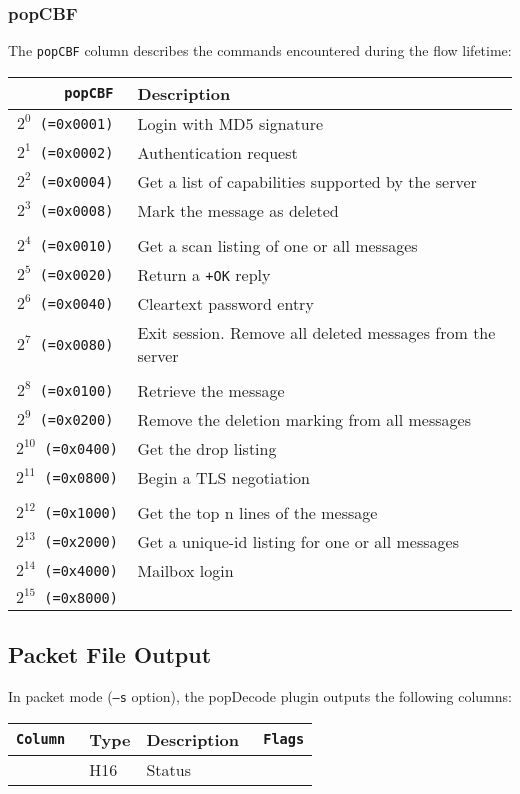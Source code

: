 \documentclass[documentation]{subfiles}
\begin{document}
\subsubsection{popCBF}\label{popCBF}
The {\tt popCBF} column describes the commands encountered during the flow lifetime:
\begin{longtable}{>{\tt}rl}
    \toprule
    {\bf popCBF} & {\bf Description} \\
    \midrule\endhead%
    $2^{0}$  (=0x0001) & Login with MD5 signature \\
    $2^{1}$  (=0x0002) & Authentication request \\
    $2^{2}$  (=0x0004) & Get a list of capabilities supported by the server \\
    $2^{3}$  (=0x0008) & Mark the message as deleted \\
    \\
    $2^{4}$  (=0x0010) & Get a scan listing of one or all messages \\
    $2^{5}$  (=0x0020) & Return a {\tt +OK} reply \\
    $2^{6}$  (=0x0040) & Cleartext password entry \\
    $2^{7}$  (=0x0080) & Exit session. Remove all deleted messages from the server \\
    \\
    $2^{8}$  (=0x0100) & Retrieve the message \\
    $2^{9}$  (=0x0200) & Remove the deletion marking from all messages \\
    $2^{10}$ (=0x0400) & Get the drop listing \\
    $2^{11}$ (=0x0800) & Begin a TLS negotiation \\
    \\
    $2^{12}$ (=0x1000) & Get the top n lines of the message \\
    $2^{13}$ (=0x2000) & Get a unique-id listing for one or all messages \\
    $2^{14}$ (=0x4000) & Mailbox login \\
    $2^{15}$ (=0x8000) & \\
    \bottomrule
\end{longtable}

\subsection{Packet File Output}
In packet mode ({\tt --s} option), the popDecode plugin outputs the following columns:
\begin{longtable}{>{\tt}lll>{\tt\small}l}
    \toprule
    {\bf Column} & {\bf Type} & {\bf Description} & {\bf Flags}\\
    \midrule\endhead%
    \nameref{popStat} & H16 & Status & \\
    \bottomrule
\end{longtable}
\end{document}
